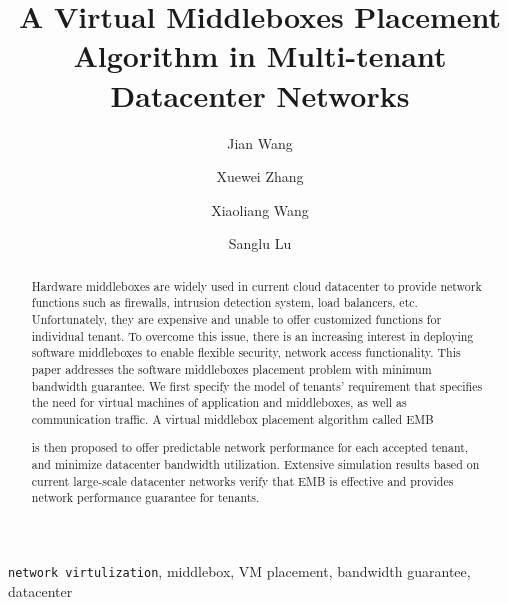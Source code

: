 \documentclass[review]{elsarticle}
\begin{document}
%
\begin{frontmatter}
\title{A Virtual Middleboxes Placement Algorithm in Multi-tenant Datacenter Networks}
\author[addra]{Jian Wang}
\author[addra]{Xuewei Zhang}
\author[addra]{Xiaoliang Wang}
\author[addra]{Sanglu Lu}
\address[addra]{National Key Laboratory for Novel Software Technology, Nanjing University, Nanjing, P.R. China}



\begin{abstract}
Hardware middleboxes are widely used in current cloud datacenter to provide network functions such as firewalls, intrusion detection system, load balancers, etc. Unfortunately, they are expensive and unable to offer customized functions for individual tenant. To overcome this issue, there is an increasing interest in deploying software middleboxes to enable flexible security, network access functionality. This paper addresses the software middleboxes placement problem with minimum bandwidth guarantee. We first specify the model of tenants' requirement that specifies the need for virtual machines of application and middleboxes, as well as communication traffic. A virtual middlebox placement algorithm called EMB  
is then proposed to offer predictable network performance for each accepted tenant, and minimize  datacenter bandwidth utilization. Extensive simulation results based on current large-scale datacenter networks verify that EMB is effective and provides network performance guarantee for tenants. 
\end{abstract}
\begin{keyword}
	\texttt{network virtulization}, middlebox, VM placement, bandwidth guarantee, datacenter
\end{keyword}
\end{frontmatter}
\linenumbers
\end{document}
